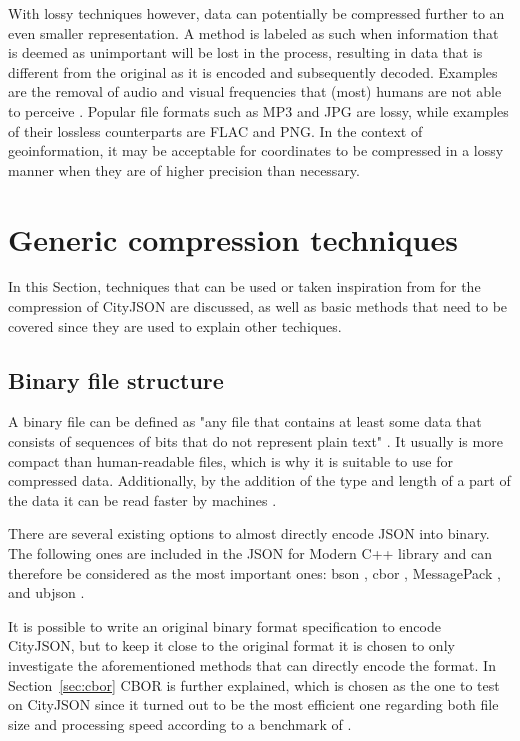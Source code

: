 With lossy techniques however, data can potentially be compressed further to an even smaller representation.
A method is labeled as such when information that is deemed as unimportant will be lost in the process, resulting in data that is different from the original as it is encoded and subsequently decoded.
Examples are the removal of audio and visual frequencies that (most) humans are not able to perceive \citep{sayood2017introduction}.
Popular file formats such as MP3 and JPG are lossy, while examples of their lossless counterparts are FLAC and PNG.
In the context of geoinformation, it may be acceptable for coordinates to be compressed in a lossy manner when they are of higher precision than necessary.



\section{Generic compression techniques}
\label{sec:genericcompression}
In this Section, techniques that can be used or taken inspiration from for the compression of CityJSON are discussed, as well as basic methods that need to be covered since they are used to explain other techiques.


\subsection{Binary file structure}
\label{sec:binary}
A binary file can be defined as "any file that contains at least some data that consists of sequences of bits that do not represent plain text" \citep{linfo}.
It usually is more compact than human-readable files, which is why it is suitable to use for compressed data.
Additionally, by the addition of the type and length of a part of the data it can be read faster by machines \citep{bson}.

There are several existing options to almost directly encode JSON into binary. The following ones are included in the JSON for Modern C++ library \citep{nlohmann} and can therefore be considered as the most important ones: \ac{bson} \citep{bson}, \ac{cbor} \citep{cborurl}, MessagePack \citep{MessagePack2019}, and \ac{ubjson} \citep{UBJSON2020}.

It is possible to write an original binary format specification to encode CityJSON, but to keep it close to the original format it is chosen to only investigate the aforementioned methods that can directly encode the format.
In Section~\ref{sec:cbor} CBOR is further explained, which is chosen as the one to test on CityJSON since it turned out to be the most efficient one regarding both file size and processing speed according to a benchmark of \citet{Zderadicka2017}.

